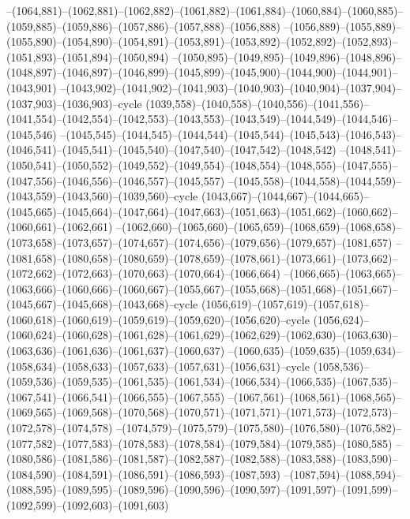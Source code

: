 --(1064,881)--(1062,881)--(1062,882)--(1061,882)--(1061,884)--(1060,884)--(1060,885)--(1059,885)--(1059,886)--(1057,886)--(1057,888)--(1056,888)
--(1056,889)--(1055,889)--(1055,890)--(1054,890)--(1054,891)--(1053,891)--(1053,892)--(1052,892)--(1052,893)--(1051,893)--(1051,894)--(1050,894)
--(1050,895)--(1049,895)--(1049,896)--(1048,896)--(1048,897)--(1046,897)--(1046,899)--(1045,899)--(1045,900)--(1044,900)--(1044,901)--(1043,901)
--(1043,902)--(1041,902)--(1041,903)--(1040,903)--(1040,904)--(1037,904)--(1037,903)--(1036,903)--cycle
(1039,558)--(1040,558)--(1040,556)--(1041,556)--(1041,554)--(1042,554)--(1042,553)--(1043,553)--(1043,549)--(1044,549)--(1044,546)--(1045,546)
--(1045,545)--(1044,545)--(1044,544)--(1045,544)--(1045,543)--(1046,543)--(1046,541)--(1045,541)--(1045,540)--(1047,540)--(1047,542)--(1048,542)
--(1048,541)--(1050,541)--(1050,552)--(1049,552)--(1049,554)--(1048,554)--(1048,555)--(1047,555)--(1047,556)--(1046,556)--(1046,557)--(1045,557)
--(1045,558)--(1044,558)--(1044,559)--(1043,559)--(1043,560)--(1039,560)--cycle
(1043,667)--(1044,667)--(1044,665)--(1045,665)--(1045,664)--(1047,664)--(1047,663)--(1051,663)--(1051,662)--(1060,662)--(1060,661)--(1062,661)
--(1062,660)--(1065,660)--(1065,659)--(1068,659)--(1068,658)--(1073,658)--(1073,657)--(1074,657)--(1074,656)--(1079,656)--(1079,657)--(1081,657)
--(1081,658)--(1080,658)--(1080,659)--(1078,659)--(1078,661)--(1073,661)--(1073,662)--(1072,662)--(1072,663)--(1070,663)--(1070,664)--(1066,664)
--(1066,665)--(1063,665)--(1063,666)--(1060,666)--(1060,667)--(1055,667)--(1055,668)--(1051,668)--(1051,667)--(1045,667)--(1045,668)--(1043,668)--cycle
(1056,619)--(1057,619)--(1057,618)--(1060,618)--(1060,619)--(1059,619)--(1059,620)--(1056,620)--cycle
(1056,624)--(1060,624)--(1060,628)--(1061,628)--(1061,629)--(1062,629)--(1062,630)--(1063,630)--(1063,636)--(1061,636)--(1061,637)--(1060,637)
--(1060,635)--(1059,635)--(1059,634)--(1058,634)--(1058,633)--(1057,633)--(1057,631)--(1056,631)--cycle
(1058,536)--(1059,536)--(1059,535)--(1061,535)--(1061,534)--(1066,534)--(1066,535)--(1067,535)--(1067,541)--(1066,541)--(1066,555)--(1067,555)
--(1067,561)--(1068,561)--(1068,565)--(1069,565)--(1069,568)--(1070,568)--(1070,571)--(1071,571)--(1071,573)--(1072,573)--(1072,578)--(1074,578)
--(1074,579)--(1075,579)--(1075,580)--(1076,580)--(1076,582)--(1077,582)--(1077,583)--(1078,583)--(1078,584)--(1079,584)--(1079,585)--(1080,585)
--(1080,586)--(1081,586)--(1081,587)--(1082,587)--(1082,588)--(1083,588)--(1083,590)--(1084,590)--(1084,591)--(1086,591)--(1086,593)--(1087,593)
--(1087,594)--(1088,594)--(1088,595)--(1089,595)--(1089,596)--(1090,596)--(1090,597)--(1091,597)--(1091,599)--(1092,599)--(1092,603)--(1091,603)
